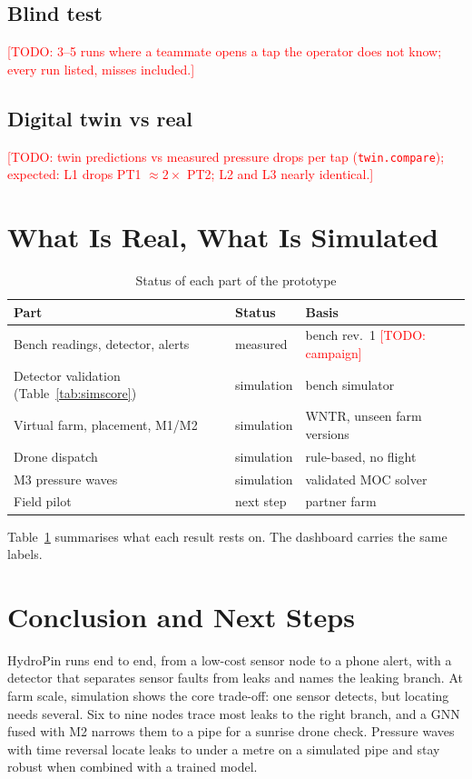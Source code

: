 \documentclass[conference]{IEEEtran}
\newcommand{\TODO}[1]{\textcolor{red}{[TODO: #1]}}
\begin{document}
\subsection{Blind test}
\TODO{3--5 runs where a teammate opens a tap the operator does not know; every run listed,
misses included.}

\subsection{Digital twin vs real}
\TODO{twin predictions vs measured pressure drops per tap (\texttt{twin.compare}); expected:
L1 drops PT1 $\approx 2\times$ PT2; L2 and L3 nearly identical.}

\section{What Is Real, What Is Simulated}
\begin{table}[t]
\caption{Status of each part of the prototype}
\label{tab:real}
\centering
\footnotesize
\begin{tabular}{@{}p{3.1cm}p{1.6cm}p{2.8cm}@{}}
\toprule
Part & Status & Basis\\
\midrule
Bench readings, detector, alerts & measured & bench rev.~1 \TODO{campaign}\\
Detector validation (Table~\ref{tab:simscore}) & simulation & bench simulator\\
Virtual farm, placement, M1/M2 & simulation & WNTR, unseen farm versions\\
Drone dispatch & simulation & rule-based, no flight\\
M3 pressure waves & simulation & validated MOC solver\\
Field pilot & next step & partner farm\\
\bottomrule
\end{tabular}
\end{table}
Table~\ref{tab:real} summarises what each result rests on. The dashboard carries the same
labels.

\section{Conclusion and Next Steps}
HydroPin runs end to end, from a low-cost sensor node to a phone alert, with a detector that
separates sensor faults from leaks and names the leaking branch. At farm scale, simulation shows
the core trade-off: one sensor detects, but locating needs several. Six to nine nodes trace most
leaks to the right branch, and a GNN fused with M2 narrows them to a pipe for a sunrise drone
check. Pressure waves with time reversal locate leaks to under a metre on a simulated pipe and
stay robust when combined with a trained model.
\end{document}
